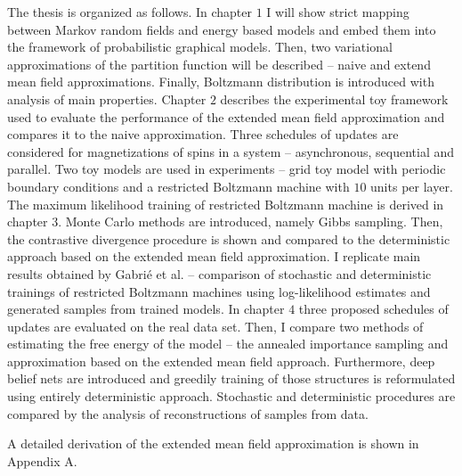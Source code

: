The thesis is organized as follows. In chapter $1$ I will show strict mapping between Markov random fields and energy based models and embed them into the framework of probabilistic graphical models. Then, two variational approximations of the partition function will be described -- naive and extend mean field approximations. Finally, Boltzmann distribution is introduced with analysis of main properties. Chapter $2$ describes the experimental toy framework used to evaluate the performance of the extended mean field approximation and compares it to the naive approximation. Three schedules of updates are considered for magnetizations of spins in a system -- asynchronous, sequential and parallel. Two toy models are used in experiments -- grid toy model with periodic boundary conditions and a restricted Boltzmann machine with $10$ units per layer. 
The maximum likelihood training of restricted Boltzmann machine is derived in chapter $3$. Monte Carlo methods are introduced, namely Gibbs sampling. Then, the contrastive divergence procedure is shown and compared to the deterministic approach based on the extended mean field approximation. I replicate main results obtained by Gabri\'e et al. -- comparison of stochastic and deterministic trainings of restricted Boltzmann machines using log-likelihood estimates and generated samples from trained models.
In chapter $4$ three proposed schedules of updates are evaluated on the real data set. Then, I compare two methods of estimating the free energy of the model -- the annealed importance sampling and approximation based on the extended mean field approach.
Furthermore, deep belief nets are introduced and greedily training of those structures is reformulated using entirely deterministic approach. Stochastic and deterministic procedures are compared by the analysis of reconstructions of samples from data.

A detailed derivation of the extended mean field approximation is shown in Appendix A.
